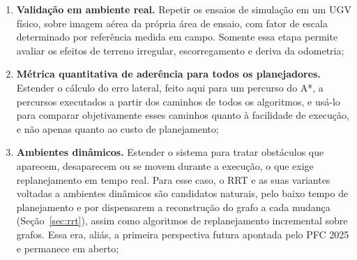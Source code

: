 \documentclass[
    12pt,
    openright,
    oneside,
    a4paper,
    english,
    brazil
]{abntex2}
\begin{document}
\begin{enumerate}
    \item \textbf{Validação em ambiente real.} Repetir os ensaios de simulação em um UGV físico, sobre imagem aérea da própria área de ensaio, com fator de escala determinado por referência medida em campo. Somente essa etapa permite avaliar os efeitos de terreno irregular, escorregamento e deriva da odometria;
    \item \textbf{Métrica quantitativa de aderência para todos os planejadores.} Estender o cálculo do erro lateral, feito aqui para um percurso do A*, a percursos executados a partir dos caminhos de todos os algoritmos, e usá-lo para comparar objetivamente esses caminhos quanto à facilidade de execução, e não apenas quanto ao custo de planejamento;
    \item \textbf{Ambientes dinâmicos.} Estender o sistema para tratar obstáculos que aparecem, desaparecem ou se movem durante a execução, o que exige replanejamento em tempo real. Para esse caso, o RRT e as suas variantes voltadas a ambientes dinâmicos \cite{xu2024} são candidatos naturais, pelo baixo tempo de planejamento e por dispensarem a reconstrução do grafo a cada mudança (Seção~\ref{sec:rrt}), assim como algoritmos de replanejamento incremental sobre grafos. Essa era, aliás, a primeira perspectiva futura apontada pelo PFC 2025 e permanece em aberto;

\end{enumerate}
\end{document}

